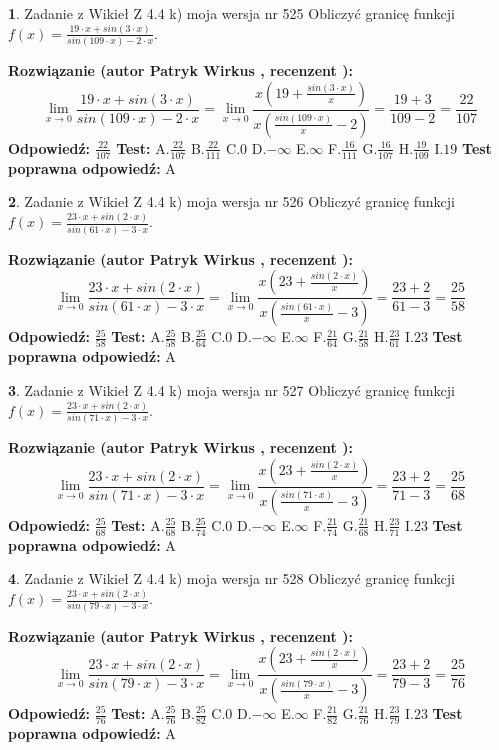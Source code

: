 \documentclass[12pt, a4paper]{article}
\theoremstyle{definition} %
\newtheorem{zad}{}
\newcommand{\zadStart}[1]{\begin{zad}#1\newline}
\newcommand{\zadStop}{\end{zad}}
\newcommand{\rozwStart}[2]{\noindent \textbf{Rozwiązanie (autor #1 , recenzent #2): }\newline}
\newcommand{\rozwStop}{\newline}
\newcommand{\odpStart}{\noindent \textbf{Odpowiedź:}\newline}
\newcommand{\odpStop}{\newline}
\newcommand{\testStart}{\noindent \textbf{Test:}\newline}
\newcommand{\testStop}{\newline}
\newcommand{\kluczStart}{\noindent \textbf{Test poprawna odpowiedź:}\newline}
\newcommand{\kluczStop}{\newline}
\begin{document}
\zadStart{Zadanie z Wikieł Z 4.4 k) moja wersja nr 525}
Obliczyć granicę funkcji $f(x)=\frac{19\cdot x +sin(3\cdot x)}{sin(109\cdot x) -2\cdot x}$.
\zadStop
\rozwStart{Patryk Wirkus}{}
$$\lim\limits_{x\to 0}\frac{19\cdot x +sin(3\cdot x)}{sin(109\cdot x) -2\cdot x}
=\lim\limits_{x\to 0}\frac{x(19+\frac{sin(3\cdot x)}{x})}{x(\frac{sin(109\cdot x)}{x}-2)}
=\frac{19+3}{109-2} = \frac{22}{107}$$
\rozwStop
\odpStart
$\frac{22}{107}$
\odpStop
\testStart
A.$\frac{22}{107}$
B.$\frac{22}{111}$
C.$0$
D.$-\infty$
E.$\infty$
F.$\frac{16}{111}$
G.$\frac{16}{107}$
H.$\frac{19}{109}$
I.$19$
\testStop
\kluczStart
A
\kluczStop



\zadStart{Zadanie z Wikieł Z 4.4 k) moja wersja nr 526}
Obliczyć granicę funkcji $f(x)=\frac{23\cdot x +sin(2\cdot x)}{sin(61\cdot x) -3\cdot x}$.
\zadStop
\rozwStart{Patryk Wirkus}{}
$$\lim\limits_{x\to 0}\frac{23\cdot x +sin(2\cdot x)}{sin(61\cdot x) -3\cdot x}
=\lim\limits_{x\to 0}\frac{x(23+\frac{sin(2\cdot x)}{x})}{x(\frac{sin(61\cdot x)}{x}-3)}
=\frac{23+2}{61-3} = \frac{25}{58}$$
\rozwStop
\odpStart
$\frac{25}{58}$
\odpStop
\testStart
A.$\frac{25}{58}$
B.$\frac{25}{64}$
C.$0$
D.$-\infty$
E.$\infty$
F.$\frac{21}{64}$
G.$\frac{21}{58}$
H.$\frac{23}{61}$
I.$23$
\testStop
\kluczStart
A
\kluczStop



\zadStart{Zadanie z Wikieł Z 4.4 k) moja wersja nr 527}
Obliczyć granicę funkcji $f(x)=\frac{23\cdot x +sin(2\cdot x)}{sin(71\cdot x) -3\cdot x}$.
\zadStop
\rozwStart{Patryk Wirkus}{}
$$\lim\limits_{x\to 0}\frac{23\cdot x +sin(2\cdot x)}{sin(71\cdot x) -3\cdot x}
=\lim\limits_{x\to 0}\frac{x(23+\frac{sin(2\cdot x)}{x})}{x(\frac{sin(71\cdot x)}{x}-3)}
=\frac{23+2}{71-3} = \frac{25}{68}$$
\rozwStop
\odpStart
$\frac{25}{68}$
\odpStop
\testStart
A.$\frac{25}{68}$
B.$\frac{25}{74}$
C.$0$
D.$-\infty$
E.$\infty$
F.$\frac{21}{74}$
G.$\frac{21}{68}$
H.$\frac{23}{71}$
I.$23$
\testStop
\kluczStart
A
\kluczStop



\zadStart{Zadanie z Wikieł Z 4.4 k) moja wersja nr 528}
Obliczyć granicę funkcji $f(x)=\frac{23\cdot x +sin(2\cdot x)}{sin(79\cdot x) -3\cdot x}$.
\zadStop
\rozwStart{Patryk Wirkus}{}
$$\lim\limits_{x\to 0}\frac{23\cdot x +sin(2\cdot x)}{sin(79\cdot x) -3\cdot x}
=\lim\limits_{x\to 0}\frac{x(23+\frac{sin(2\cdot x)}{x})}{x(\frac{sin(79\cdot x)}{x}-3)}
=\frac{23+2}{79-3} = \frac{25}{76}$$
\rozwStop
\odpStart
$\frac{25}{76}$
\odpStop
\testStart
A.$\frac{25}{76}$
B.$\frac{25}{82}$
C.$0$
D.$-\infty$
E.$\infty$
F.$\frac{21}{82}$
G.$\frac{21}{76}$
H.$\frac{23}{79}$
I.$23$
\testStop
\kluczStart
A
\kluczStop
\end{document}
